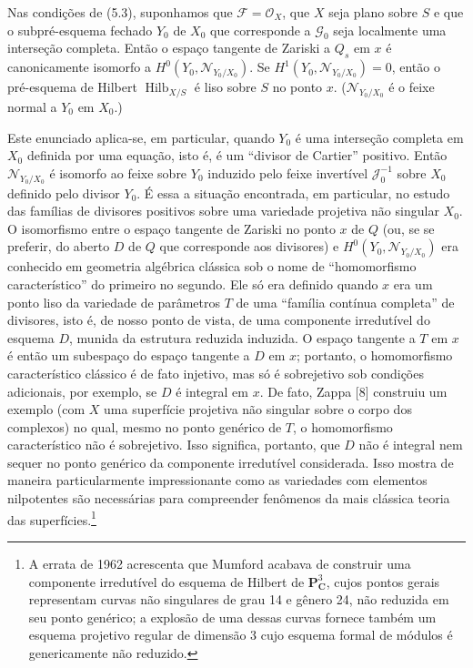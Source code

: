  Nas condições de (5.3), suponhamos que
$\mathcal F=\mathcal O_X$, que $X$ seja plano sobre $S$ e que o
subpré-esquema fechado $Y_0$ de $X_0$ que corresponde a $\mathcal G_0$ seja
localmente uma interseção completa. Então o espaço tangente de Zariski a $Q_s$
em $x$ é canonicamente isomorfo a
$H^0(Y_0,\mathcal N_{Y_0/X_0})$. Se
$H^1(Y_0,\mathcal N_{Y_0/X_0})=0$, então o pré-esquema de Hilbert
$\operatorname{Hilb}_{X/S}$ é liso sobre $S$ no ponto $x$.
($\mathcal N_{Y_0/X_0}$ é o feixe normal a $Y_0$ em $X_0$.)

 Este enunciado aplica-se, em particular, quando $Y_0$
é uma interseção completa em $X_0$ definida por uma equação, isto é, é um
``divisor de Cartier'' positivo. Então $\mathcal N_{Y_0/X_0}$ é isomorfo ao
feixe sobre $Y_0$ induzido pelo feixe invertível $\mathcal J_0^{-1}$ sobre $X_0$
definido pelo divisor $Y_0$. É essa a situação encontrada, em particular, no
estudo das famílias de divisores positivos sobre uma variedade projetiva não
singular $X_0$. O isomorfismo entre o espaço tangente de Zariski no ponto $x$
de $Q$ (ou, se se preferir, do aberto $D$ de $Q$ que corresponde aos divisores)
e $H^0(Y_0,\mathcal N_{Y_0/X_0})$ era conhecido em geometria algébrica
clássica sob o nome de ``homomorfismo característico'' do primeiro no segundo.
Ele só era definido quando $x$ era um ponto liso da variedade de parâmetros
$T$ de uma ``família contínua completa'' de divisores, isto é, de nosso ponto
de vista, de uma componente irredutível do esquema $D$, munida da estrutura
reduzida induzida. O espaço tangente a $T$ em $x$ é então um subespaço do
espaço tangente a $D$ em $x$; portanto, o homomorfismo característico clássico
é de fato injetivo, mas só é sobrejetivo sob condições adicionais, por exemplo,
se $D$ é integral em $x$. De fato, Zappa [8] construiu um exemplo
(com $X$ uma superfície projetiva não singular sobre o corpo dos complexos) no
qual, mesmo no ponto genérico de $T$, o homomorfismo característico não é
sobrejetivo. Isso significa, portanto, que $D$ não é integral nem sequer no
ponto genérico da componente irredutível considerada. Isso mostra de maneira
particularmente impressionante como as variedades com elementos nilpotentes
são necessárias para compreender fenômenos da mais clássica teoria das
superfícies.\footnote{A errata de 1962 acrescenta que Mumford acabava de
construir uma componente irredutível do esquema de Hilbert de
$\mathbf P^3_{\mathbf C}$, cujos pontos gerais representam curvas não
singulares de grau 14 e gênero 24, não reduzida em seu ponto genérico; a
explosão de uma dessas curvas fornece também um esquema projetivo regular de
dimensão 3 cujo esquema formal de módulos é genericamente não reduzido.}

